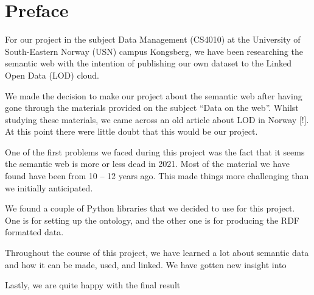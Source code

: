 \chapter*{Preface}

For our project in the subject Data Management (CS4010) at the University of South-Eastern Norway (USN) campus Kongsberg, we have been researching the semantic web with the intention of publishing our own dataset to the Linked Open Data (LOD) cloud.

\vspace{5mm}


We made the decision to make our project about the semantic web after having gone through the materials provided on the subject “Data on the web”. Whilst studying these materials, we came across an old article about LOD in Norway [!]. At this point there were little doubt that this would be our project.

\vspace{5mm}

One of the first problems we faced during this project was the fact that it seems the semantic web is more or less dead in 2021. Most of the material we have found have been from 10 – 12 years ago. This made things more challenging than we initially anticipated. 

\vspace{5mm}

We found a couple of Python libraries that we decided to use for this project. One is for setting up the ontology, and the other one is for producing the RDF formatted data.

\vspace{5mm}

Throughout the course of this project, we have learned a lot about semantic data and how it can be made, used, and linked. We have gotten new insight into 

\vspace{5mm}

Lastly, we are quite happy with the final result



